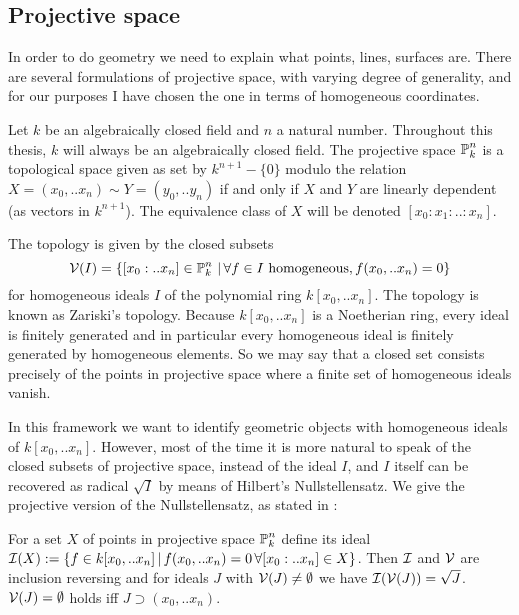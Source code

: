 \subsection{Projective space}

In order to do geometry we need to explain what points, lines, surfaces are.
There are several formulations of projective space, with varying degree of generality, and for our purposes I have chosen the one in terms of homogeneous coordinates.

Let $k$ be an algebraically closed field and $n$ a natural number.
Throughout this thesis, $k$ will always be an algebraically closed field.
The projective space $\operatorname{\mathbb P}^n_k$ is a topological space given as set by  $k^{n+1} - \{ 0 \}$ modulo the relation $X=(x_0,..x_n) \sim Y=(y_0,..y_n)$ if and only if $X$ and $Y$ are linearly dependent (as vectors in $k^{n+1}$). The equivalence class of $X$ will be denoted $[x_0:x_1:..:x_n]$.

The topology is given by the closed subsets
\begin{equation}
\operatorname{\mathcal V}(I) =
\left\lbrace [x_0:..x_n] \in \operatorname{\mathbb P}^n_k\,|\,  \forall f\in I \text{ homogeneous}, f(x_0,..x_n) = 0\right\rbrace
\end{equation}
for homogeneous ideals $I$ of the polynomial ring $k[x_0,..x_n]$.
The topology is known as Zariski's topology.
Because $k[x_0,..x_n]$ is a Noetherian ring, every ideal is finitely generated and in particular every homogeneous ideal is finitely generated by homogeneous elements.
So we may say that a closed set consists precisely of the points in projective space where a finite set of homogeneous ideals vanish.

In this framework we want to identify geometric objects with homogeneous ideals of $k[x_0,..x_n]$.
However, most of the time it is more natural to speak of the closed subsets of projective space, instead of the ideal $I$, and $I$ itself can be recovered as radical $\sqrt{I}$ by means of Hilbert's Nullstellensatz.
We give the projective version of the Nullstellensatz, as stated in \cite[section 5.3]{reid1988undergraduate}:

\begin{theorem}
For a set $X$ of points in projective space $\operatorname{\mathbb P}^n_k$ define its ideal $\operatorname{\mathcal I}(X) := \left\lbrace f \in k[x_0,..x_n]\,|\, f(x_0,..x_n) = 0\,\forall [x_0:..x_n] \in X\right\rbrace$.
Then $\operatorname{\mathcal I}$ and $\operatorname{\mathcal V}$ are inclusion reversing and for ideals $J$ with $\operatorname{\mathcal V}(J) \neq \emptyset$ we have $\operatorname{\mathcal I}(\operatorname{\mathcal V}(J)) = \sqrt{J}$.
$\operatorname{\mathcal V}(J) = \emptyset$ holds iff $J \supset (x_0,..x_n)$.
\end{theorem}

